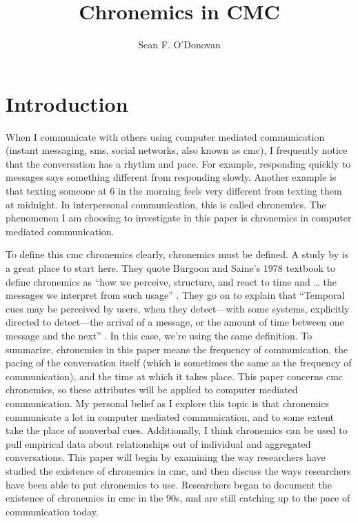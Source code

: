 \documentclass[
  stu]{apa7}
\affiliation{Brian Lamb School of Communication}
\title{Chronemics in CMC}
\author{Sean F. O'Donovan}
\date{}
\begin{document}
\maketitle

\hypertarget{introduction}{%
\section{Introduction}\label{introduction}}

When I communicate with others using computer mediated communication
(instant messaging, sms, social networks, also known as cmc), I
frequently notice that the conversation has a rhythm and pace. For
example, responding quickly to messages says something different from
responding slowly. Another example is that texting someone at 6 in the
morning feels very different from texting them at midnight. In
interpersonal communication, this is called chronemics. The phenomenon I
am choosing to investigate in this paper is chronemics in computer
mediated communication.

To define this cmc chronemics clearly, chronemics must be defined. A
study by \textcite{walther95} is a great place to start here. They quote
Burgoon and Saine's 1978 textbook to define chronemics as ``how we
perceive, structure, and react to time and \ldots{} the messages we
interpret from such usage'' \autocite[qtd. as cited in][
356]{walther95}. They go on to explain that ``Temporal cues may be
perceived by users, when they detect---with some systems, explicitly
directed to detect---the arrival of a message, or the amount of time
between one message and the next'' \autocite[ 356]{walther95}. In this
case, we're using the same definition. To summarize, chronemics in this
paper means the frequency of communication, the pacing of the
conversation itself (which is sometimes the same as the frequency of
communication), and the time at which it takes place. This paper
concerns cmc chronemics, so these attributes will be applied to computer
mediated communication. My personal belief as I explore this topic is
that chronemics communicate a lot in computer mediated communication,
and to some extent take the place of nonverbal cues. Additionally, I
think chronemics can be used to pull empirical data about relationships
out of individual and aggregated conversations. This paper will begin by
examining the way researchers have studied the existence of chronemics
in cmc, and then discuss the ways researchers have been able to put
chronemics to use. Researchers began to document the existence of
chronemics in cmc in the 90s, and are still catching up to the pace of
communication today.
\end{document}
